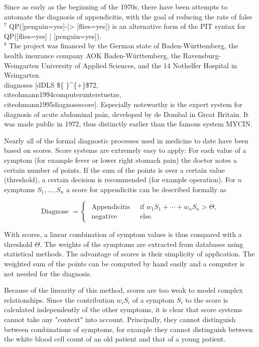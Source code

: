 \documentclass[10pt]{book}
\begin{document}
Since as early as the beginning of the 1970s, there have been attempts to automate the diagnosis of appendicitis, with the goal of reducing the rate of false\\
${ }^{7}$ QP([penguin=yes]-|> [flies=yes]) is an alternative form of the PIT syntax for QP([flies=yes] | [penguin=yes]).\\
${ }^{8}$ The project was financed by the German state of Baden-Württemberg, the health insurance company AOK Baden-Württemberg, the Ravensburg-Weingarten University of Applied Sciences, and the 14 Nothelfer Hospital in Weingarten.\\[0pt]
diagnoses [dDLS \$\{ \}\^{}\{+\}\$72, \\cite{ohmann1994computerunterstuetze}, \\cite{ohmann1995diagnosescore}]. Especially noteworthy is the expert system for diagnosis of acute abdominal pain, developed by de Dombal in Great Britain. It was made public in 1972, thus distinctly earlier than the famous system MYCIN.


Nearly all of the formal diagnostic processes used in medicine to date have been based on scores. Score systems are extremely easy to apply: For each value of a symptom (for example fever or lower right stomach pain) the doctor notes a certain number of points. If the sum of the points is over a certain value (threshold), a certain decision is recommended (for example operation). For $n$ symptoms $S_{1}, \ldots, S_{n}$ a score for appendicitis can be described formally as

$$
\text { Diagnose }= \begin{cases}\text { Appendicitis } & \text { if } w_{1} S_{1}+\cdots+w_{n} S_{n}>\Theta, \\ \text { negative } & \text { else. }\end{cases}
$$

With scores, a linear combination of symptom values is thus compared with a threshold $\Theta$. The weights of the symptoms are extracted from databases using statistical methods. The advantage of scores is their simplicity of application. The weighted sum of the points can be computed by hand easily and a computer is not needed for the diagnosis.

Because of the linearity of this method, scores are too weak to model complex relationships. Since the contribution $w_{i} S_{i}$ of a symptom $S_{i}$ to the score is calculated independently of the other symptoms, it is clear that score systems cannot take any "context" into account. Principally, they cannot distinguish between combinations of symptoms, for example they cannot distinguish between the white blood cell count of an old patient and that of a young patient.
\end{document}
